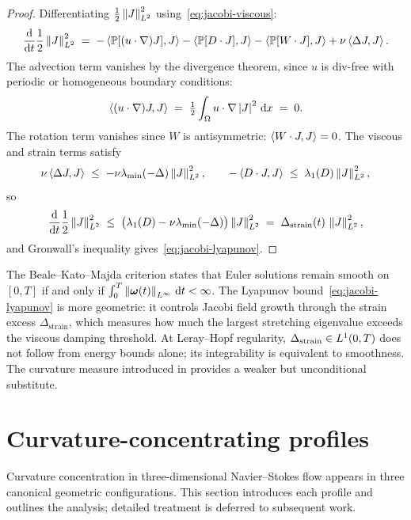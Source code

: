 \begin{proof}
  Differentiating $\tfrac{1}{2}\left\lVert J \right\rVert^2_{L^{2}}$ using~\eqref{eq:jacobi-viscous}:
  \[
    \frac{\mathrm{d}}{\mathrm{d} t}\frac{1}{2}\left\lVert J \right\rVert^2_{L^{2}}
    \;=\; -\left\langle \mathbb{P}[(u\cdot\nabla)J], J \right\rangle
          -\left\langle \mathbb{P}[D\cdot J], J \right\rangle
          -\left\langle \mathbb{P}[W\cdot J], J \right\rangle
          + \nu\left\langle \Delta J, J \right\rangle.
  \]
  The advection term vanishes by the divergence theorem,
  since $u$ is div-free with periodic or homogeneous boundary conditions:
  \[
    \left\langle (u\cdot\nabla)J, J \right\rangle
    \;=\; \tfrac{1}{2}\int_\Omega u\cdot\nabla\left\lvert J \right\rvert^2\,\mathrm{d} x \;=\; 0.
  \]
  The rotation term vanishes since $W$ is antisymmetric: $\left\langle W\cdot J, J \right\rangle = 0$.
  The viscous and strain terms satisfy
  \[
    \nu\left\langle \Delta J, J \right\rangle
    \;\leq\; -\nu\lambda_{\min}(-\Delta)\left\lVert J \right\rVert^2_{L^{2}},
    \qquad
    -\left\langle D\cdot J, J \right\rangle
    \;\leq\; \lambda_1(D)\left\lVert J \right\rVert^2_{L^{2}},
  \]
  so
  \[
    \frac{\mathrm{d}}{\mathrm{d} t}\frac{1}{2}\left\lVert J \right\rVert^2_{L^{2}}
    \;\leq\;
    \bigl(\lambda_1(D) - \nu\lambda_{\min}(-\Delta)\bigr)\left\lVert J \right\rVert^2_{L^{2}}
    \;=\; \Delta_{\mathrm{strain}}(t)\,\left\lVert J \right\rVert^2_{L^{2}},
  \]
  and Gronwall's inequality gives~\eqref{eq:jacobi-lyapunov}.
\end{proof}

\begin{remark}\label{rem:jacobi-bkm}
  The Beale--Kato--Majda criterion \cite{beale1984remarks} states that Euler solutions
  remain smooth on $[0,T]$ if and only if
  $\int_0^T \left\lVert \boldsymbol{\omega}(t) \right\rVert_{L^{\infty}}\,\mathrm{d} t < \infty$.
  The Lyapunov bound~\eqref{eq:jacobi-lyapunov} is more geometric: it controls Jacobi
  field growth through the strain excess $\Delta_{\mathrm{strain}}$, which measures how
  much the largest stretching eigenvalue exceeds the viscous damping threshold.
  At Leray--Hopf regularity, $\Delta_{\mathrm{strain}} \in L^{1}(0,T)$ does not
  follow from energy bounds alone; its integrability is equivalent to smoothness.
  The curvature measure introduced in  provides a weaker but
  unconditional substitute.
\end{remark}

\section{Curvature-concentrating profiles}\label{sec:curv-profiles}

Curvature concentration in three-dimensional Navier--Stokes flow appears in three
canonical geometric configurations.  This section introduces each profile and outlines
the analysis; detailed treatment is deferred to subsequent work.

